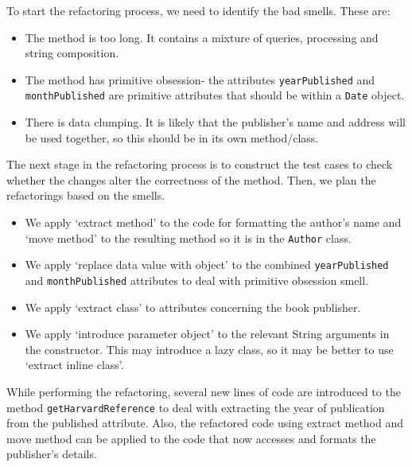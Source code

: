 \documentclass[a4paper, openany]{memoir}
\begin{document}
To start the refactoring process, we need to identify the bad smells. These are:
\begin{itemize}
    \item The method is too long. It contains a mixture of queries, processing and string composition.
    \item The method has primitive obsession- the attributes \texttt{yearPublished} and \texttt{monthPublished} are primitive attributes that should be within a \texttt{Date} object.
    \item There is data clumping. It is likely that the publisher's name and address will be used together, so this should be in its own method/class.
\end{itemize}

The next stage in the refactoring process is to construct the test cases to check whether the changes alter the correctness of the method. Then, we plan the refactorings based on the smells.
\begin{itemize}
    \item We apply `extract method' to the code for formatting the author's name and `move method' to the resulting method so it is in the \texttt{Author} class.
    \item We apply `replace data value with object' to the combined \texttt{yearPublished} and \texttt{monthPublished} attributes to deal with primitive obsession smell.
    \item We apply `extract class' to attributes concerning the book publisher.
    \item We apply `introduce parameter object' to the relevant String arguments in the constructor. This may introduce a lazy class, so it may be better to use `extract inline class'.
\end{itemize}
While performing the refactoring, several new lines of code are introduced to the method \texttt{getHarvardReference} to deal with extracting the year of publication from the published attribute. Also, the refactored code using extract method and move method can be applied to the code that now accesses and formats the publisher's details.
\end{document}

